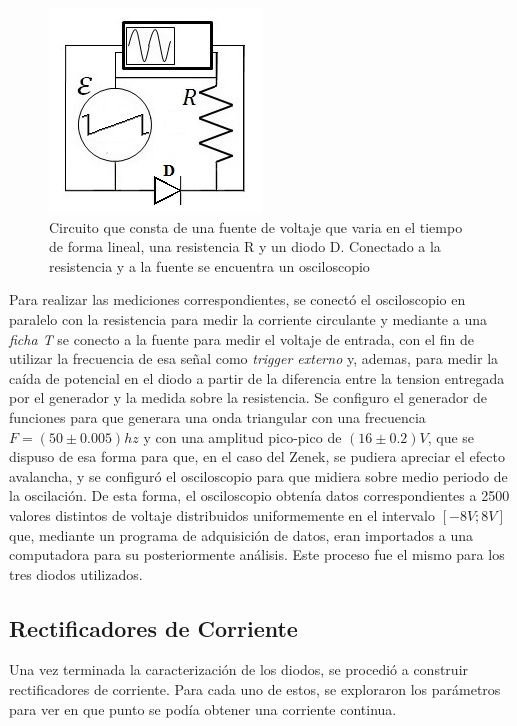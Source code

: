 \documentclass[11pt,a4paper]{article}
\begin{document}
\begin{figure}[H]
\centering
\includegraphics[scale=0.8]{Caracterizar-Diodo}
   \caption{Circuito que consta de una fuente de voltaje que varia en el tiempo de forma lineal, una resistencia R y un diodo D. Conectado a la resistencia y a la fuente se encuentra un osciloscopio}
   \label{fig:Car-Dio}
\end{figure}

Para realizar las mediciones correspondientes, se conectó el osciloscopio en paralelo con la resistencia para medir la corriente circulante y mediante a una \textit{ficha T} se conecto a la fuente para medir el voltaje de entrada, con el fin de utilizar la frecuencia de esa señal como \textit{trigger externo} y, ademas, para medir la caída de potencial en el diodo a partir de la diferencia entre la tension entregada por el generador y la medida sobre la resistencia. Se configuro el generador de funciones para que generara una onda triangular con una frecuencia  $F = (50 \pm 0.005)hz$ y con una amplitud pico-pico de $(16 \pm 0.2)V$, que se dispuso de esa forma para que, en el caso del Zenek, se pudiera apreciar el efecto avalancha, y se configuró el osciloscopio para que midiera sobre medio periodo de la oscilación. De esta forma, el osciloscopio obtenía datos correspondientes a 2500 valores distintos de voltaje distribuidos uniformemente en el intervalo $[-8V;8V]$ que, mediante un programa de adquisición de datos, eran importados a una computadora para su posteriormente análisis. Este proceso fue el mismo para los tres diodos utilizados.

\subsection{Rectificadores de Corriente}
Una vez terminada la caracterización de los diodos, se procedió a construir rectificadores de corriente. Para cada uno de estos, se exploraron los parámetros para ver en que punto se podía obtener una corriente continua.
\end{document}
